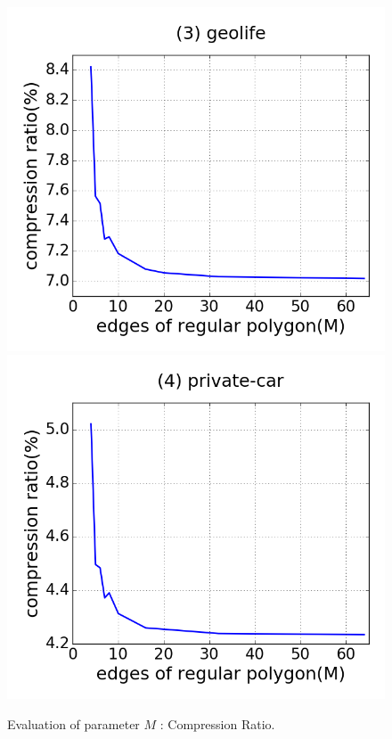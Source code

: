 \begin{figure}[tb!]
\includegraphics[scale = 0.25]{figures/Exp-M-cr-geolife.png}
\includegraphics[scale = 0.25]{figures/Exp-M-cr-private.png}
\vspace{-3ex}
\caption{\small Evaluation of parameter $M$ : Compression Ratio.}
\label{fig:m-cr}
\vspace{-1ex}
\end{figure}


